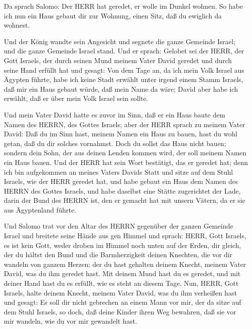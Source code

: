  Da sprach Salomo: Der HERR hat geredet, er wolle im Dunkel
wohnen.  So habe ich nun ein Haus gebaut dir zur Wohnung,
einen Sitz, daß du ewiglich da wohnest.

 Und der König wandte sein Angesicht und segnete die ganze
Gemeinde Israel; und die ganze Gemeinde Israel stand.  Und
er sprach: Gelobet sei der HERR, der Gott Israels, der durch seinen Mund
meinem Vater David geredet und durch seine Hand erfüllt hat und gesagt:
 Von dem Tage an, da ich mein Volk Israel aus Ägypten
führte, habe ich keine Stadt erwählt unter irgend einem Stamm Israels,
daß mir ein Haus gebaut würde, daß mein Name da wäre; David aber habe
ich erwählt, daß er über mein Volk Israel sein sollte.

 Und mein Vater David hatte es zuvor im Sinn, daß er ein
Haus baute dem Namen des HERRN, des Gottes Israels;  aber
der HERR sprach zu meinem Vater David: Daß du im Sinn hast, meinem Namen
ein Haus zu bauen, hast du wohl getan, daß du dir solches vornahmst.
 Doch du sollst das Haus nicht bauen; sondern dein Sohn,
der aus deinen Lenden kommen wird, der soll meinem Namen ein Haus bauen.
 Und der HERR hat sein Wort bestätigt, das er geredet hat;
denn ich bin aufgekommen an meines Vaters Davids Statt und sitze auf dem
Stuhl Israels, wie der HERR geredet hat, und habe gebaut ein Haus dem
Namen des HERRN des Gottes Israels,  und habe daselbst eine
Stätte zugerichtet der Lade, darin der Bund des HERRN ist, den er
gemacht hat mit unsern Vätern, da er sie aus Ägyptenland führte.

 Und Salomo trat vor den Altar des HERRN gegenüber der
ganzen Gemeinde Israel und breitete seine Hände aus gen Himmel
 und sprach: HERR, Gott Israels, es ist kein Gott, weder
droben im Himmel noch unten auf der Erden, dir gleich, der du hältst den
Bund und die Barmherzigkeit deinen Knechten, die vor dir wandeln von
ganzem Herzen;  der du hast gehalten deinem Knecht, meinem
Vater David, was du ihm geredet hast. Mit deinem Mund hast du es
geredet, und mit deiner Hand hast du es erfüllt, wie es steht an diesem
Tage.  Nun, HERR, Gott Israels, halte deinem Knecht, meinem
Vater David, was du ihm verheißen hast und gesagt: Es soll dir nicht
gebrechen an einem Mann vor mir, der da sitze auf dem Stuhl Israels, so
doch, daß deine Kinder ihren Weg bewahren, daß sie vor mir wandeln, wie
du vor mir gewandelt hast.

